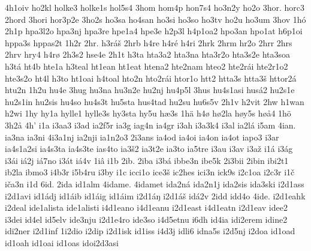 {    4h1oiv
    ho2kl
    holke3
    holke1s
    hol5s4
    3hom
    hom4p
    hon7s4
    ho3n2y
    ho2o
    3hor.
    horc3
    2hord
    3hori
    hor3p2e
    3ho2s
    ho3sa
    ho4san
    ho3si
    ho3so
    ho3tv
    ho2u
    ho3um
    3hov
    1hó
    2h1p
    hpa3l2o
    hpa3nj
    hpa3re
    hpe1a4
    hpe3e
    h2p3l
    h4p1oa2
    hpo3an
    hpo1at
    h6p1oi
    hppa3s
    hppas2t
    1h2r
    2hr.
    h3ráš
    2hrb
    h4re
    h4ré
    h4ri
    2hrk
    2hrm
    hr2o
    2hrr
    2hrs
    2hrv
    hry4
    h4rø
    2h3s2
    hse4e
    2h1t
    h3ta
    hta3a2
    hta3na
    hta3r2o
    hta3s2e
    hta3soa
    h3tá
    ht4b
    hte1a
    h3teal
    ht1ean
    ht1eat
    htena2
    hte2nam
    hteo2
    hte2rái
    hte2r1o2
    hte3s2o
    ht4l
    h3to
    ht1oai
    h4toal
    hto2n
    hto2rái
    htor1o
    htt2
    htta3s
    htta3š
    httor2á
    htu2n
    1h2u
    hu4e
    3hug
    hu3na
    hu3n2e
    hu2nj
    hu4p5l
    3hus
    hu4s1asi
    husá2
    hu2s1e
    hu2s1in
    hu2sis
    hu4so
    hu4s3t
    hu5sta
    hus4tad
    hu2su
    hu6s5v
    2h1v
    h2vit
    2hw
    h1wan
    h2wi
    1hy
    hy1a
    hylle1
    hylle3s
    hy3sta
    hy5u
    hæ3s
    1hä
    h4ø
    hø2la
    høy5s
    høå4
    1hö
    3h2å
    4h'
    i1a
    i3aa3
    i3ad
    ia2f5r
    ia3g
    iag4n
    ia4gr
    i3ah
    i3a3k4
    i3al
    ia2lá
    i5am
    4ian.
    ia3na
    ia3ni
    4i3a1nj
    ia2nji
    ia1n2o3
    2i3ans
    ia4od
    ia4oi
    ia4on
    ia4ot
    iapo3
    i3ar
    ia4s1a2si
    ia4s3ta
    ia4s3te
    ias4to
    ia3š2
    ia3t2e
    ia3to
    ia5tre
    i3au
    i3av
    i3až
    i1á
    i3ág
    i3ái
    iá2j
    iá7no
    i3át
    iá4v
    1iâ
    i1b
    2ib.
    2iba
    i3bá
    ibbe3n
    ibe5k
    2i3bii
    2ibin
    ibi2t1
    ib2la
    ibmo3
    i4b3r
    i5b4ru
    i3by
    i1c
    icci1o
    ice3š
    ic2hes
    ici3n
    ick9s
    i2c1oa
    i2c3r
    i1č
    iča3n
    i1d
    6id.
    2ida
    id1alm
    4idame.
    4idamet
    ida2ná
    ida2n1j
    ida2sis
    ida3ski
    i2d1ass
    i2d1avi
    id1ádj
    id1áib
    id1áig
    id1áim
    i2d1áŋ
    i2d1áš
    idá2v
    2idd
    idd4o
    4ide.
    i2d1eahk
    i2deal
    ide1alista
    ide1alisti
    i4d1eano
    i4d1eanu
    i2d1east
    i4d1eatn
    i2d1eav
    idee2
    i3dei
    id4el
    id5elv
    ide3nju
    i2d1e4ro
    ide3so
    i4d5etnu
    i6dh
    id4ia
    idi2erem
    idine2
    idi2ner
    i2d1inf
    1i2dio
    i2dip
    i2d1isk
    id1iss
    i4d3j
    idli6
    idna5s
    i2d5nj
    i2doa
    id1oad
    id1oah
    id1oai
    id1oas
    idoi2d3asi
}
